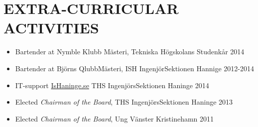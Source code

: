 \documentclass[margin]{res}
\begin{document}
\begin{resume}
\begin{itemize}
                \end{itemize}
 


\section{EXTRA-CURRICULAR \\ ACTIVITIES}
\begin{itemize}  
            \item Bartender at Nymble Klubb Mästeri, Tekniska Högskolans Studenkår \hfill 2014
            \item Bartender at Björns QlubbMästeri, ISH IngenjörSektionen Hannige \hfill 2012-2014 
            \item IT-support \href{ishaninge.se}{IsHaninge.se} THS IngenjörsSektionen Haninge  \hfill 2014
            \item Elected {\it Chairman of the Board}, THS IngenjörsSektionen Haninge \hfill 2013 
            \item Elected {\it Chairman of the Board}, Ung Vänster Kristinehamn \hfill 2011 

\end{itemize}

\end{resume}
\end{document}
